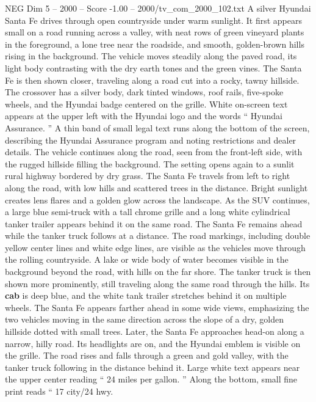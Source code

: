 \begin{textsample}{NEG Dim 5 – 2000 – Score -1.00 – 2000/tv\_com\_2000\_102.txt}  \label{ex:f5_neg_080}
A silver Hyundai Santa Fe drives through open countryside under warm sunlight.
It first appears small on a road running across a valley, with neat rows of green vineyard plants in the foreground, a lone tree near the roadside, and smooth, golden-brown hills rising in the background.
The vehicle moves steadily along the paved road, its light body contrasting with the dry earth tones and the green vines.
The Santa Fe is then shown closer, traveling along a road cut into a rocky, tawny hillside.
The crossover has a silver body, dark tinted windows, roof rails, five-spoke wheels, and the Hyundai badge centered on the grille.
White on-screen text appears at the upper left with the Hyundai logo and the words “ Hyundai Assurance. ” A thin band of small legal text runs along the bottom of the screen, describing the Hyundai Assurance program and noting restrictions and dealer details.
The vehicle continues along the road, seen from the front-left side, with the rugged hillside filling the background.
The setting opens again to a sunlit rural highway bordered by dry grass.
The Santa Fe travels from left to right along the road, with low hills and scattered trees in the distance.
Bright sunlight creates lens flares and a golden glow across the landscape.
As the SUV continues, a large blue semi-truck with a tall chrome grille and a long white cylindrical tanker trailer appears behind it on the same road.
The Santa Fe remains ahead while the tanker truck follows at a distance.
The road markings, including double yellow center lines and white edge lines, are visible as the vehicles move through the rolling countryside.
A lake or wide body of water becomes visible in the background beyond the road, with hills on the far shore.
The tanker truck is then shown more prominently, still traveling along the same road through the hills.
Its \textbf{cab} is deep blue, and the white tank trailer stretches behind it on multiple wheels.
The Santa Fe appears farther ahead in some wide views, emphasizing the two vehicles moving in the same direction across the slope of a dry, golden hillside dotted with small trees.
Later, the Santa Fe approaches head-on along a narrow, hilly road.
Its headlights are on, and the Hyundai emblem is visible on the grille.
The road rises and falls through a green and gold valley, with the tanker truck following in the distance behind it.
Large white text appears near the upper center reading “ 24 miles per gallon. ” Along the bottom, small fine print reads “ 17 city/24 hwy.

\end{textsample}
